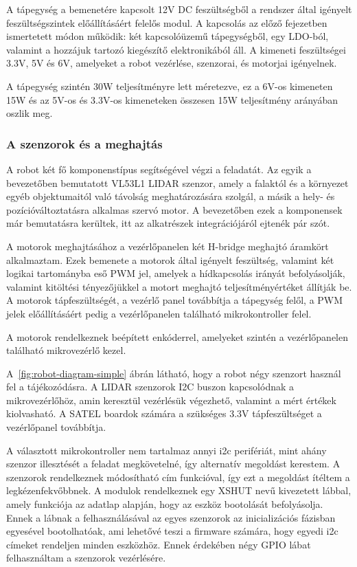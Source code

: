 \medskip

A tápegység a bemenetére kapcsolt 12V DC feszültségből a rendszer által igényelt
feszültségszintek előállításáért felelős modul. A kapcsolás az előző fejezetben
ismertetett módon működik: két kapcsolóüzemű tápegységből, egy LDO-ból, valamint
a hozzájuk tartozó kiegészítő elektronikából áll. A kimeneti feszültségei 3.3V,
5V és 6V, amelyeket a robot vezérlése, szenzorai, és motorjai igényelnek.

A tápegység szintén 30W teljesítményre lett méretezve, ez a 6V-os kimeneten 15W
és az 5V-os és 3.3V-os kimeneteken összesen 15W teljesítmény arányában oszlik
meg. 

\subsubsection{A szenzorok és a meghajtás}

A robot két fő komponenstípus segítségével végzi a feladatát. Az egyik a
bevezetőben bemutatott VL53L1 LIDAR szenzor, amely a falaktól és a környezet
egyéb objektumaitól való távolság meghatározására szolgál, a másik a hely- és
pozícióváltoztatásra alkalmas szervó motor. A bevezetőben ezek a komponensek már
bemutatásra kerültek, itt az alkatrészek integrációjáról ejtenék pár szót.

\medskip

A motorok meghajtásához a vezérlőpanelen két H-bridge meghajtó áramkört
alkalmaztam. Ezek bemenete a motorok által igényelt feszültség, valamint két
logikai tartományba eső PWM jel, amelyek a hídkapcsolás irányát befolyásolják,
valamint kitöltési tényezőjükkel a motort meghajtó teljesítményértéket állítják
be. A motorok tápfeszültségét, a vezérlő panel továbbítja a tápegység felől, a
PWM jelek előállításáért pedig a vezérlőpanelen található mikrokontroller felel.

A motorok rendelkeznek beépített enkóderrel, amelyeket szintén a vezérlőpanelen
található mikrovezérlő kezel.

\medskip

A~\ref{fig:robot-diagram-simple} ábrán látható, hogy a robot négy szenzort
használ fel a tájékozódásra. A LIDAR szenzorok I2C buszon kapcsolódnak a
mikrovezérlőhöz, amin keresztül vezérlésük végezhető, valamint a mért értékek
kiolvasható. A SATEL boardok számára a szükséges 3.3V tápfeszültséget a
vezérlőpanel továbbítja.

A választott mikrokontroller nem tartalmaz annyi i2c perifériát, mint ahány
szenzor illesztését a feladat megkövetelné, így alternatív megoldást kerestem. A
szenzorok rendelkeznek módosítható cím funkcióval, így ezt a megoldást ítéltem a
legkézenfekvőbbnek. A modulok rendelkeznek egy XSHUT nevű kivezetett lábbal,
amely funkciója az adatlap alapján, hogy az eszköz bootolását befolyásolja. Ennek
a lábnak a felhasználásával az egyes szenzorok az inicializációs fázisban
egyesével bootolhatóak, ami lehetővé teszi a firmware számára, hogy egyedi i2c
címeket rendeljen minden eszközhöz. Ennek érdekében négy GPIO lábat felhasználtam
a szenzorok vezérlésére.


